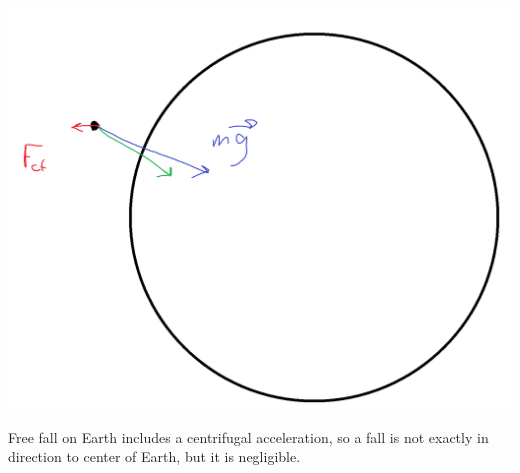 \begin{center}
	\includegraphics[width=0.7\linewidth]{./lect7/pic2.png}
\end{center}

Free fall on Earth includes a centrifugal acceleration, so a fall is not exactly in direction to center of Earth, but it is negligible.